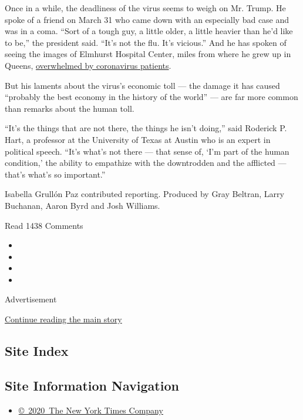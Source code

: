 Once in a while, the deadliness of the virus seems to weigh on Mr.
Trump. He spoke of a friend on March 31 who came down with an especially
bad case and was in a coma. ``Sort of a tough guy, a little older, a
little heavier than he'd like to be,'' the president said. ``It's not
the flu. It's vicious.'' And he has spoken of seeing the images of
Elmhurst Hospital Center, miles from where he grew up in Queens,
\href{https://www.nytimes.com/2020/03/25/nyregion/nyc-coronavirus-hospitals.html}{overwhelmed
by coronavirus patients}.

But his laments about the virus's economic toll --- the damage it has
caused ``probably the best economy in the history of the world'' --- are
far more common than remarks about the human toll.

``It's the things that are not there, the things he isn't doing,'' said
Roderick P. Hart, a professor at the University of Texas at Austin who
is an expert in political speech. ``It's what's not there --- that sense
of, `I'm part of the human condition,' the ability to empathize with the
downtrodden and the afflicted --- that's what's so important.''

Isabella Grullón Paz contributed reporting. Produced by Gray Beltran,
Larry Buchanan, Aaron Byrd and Josh Williams.

Read 1438 Comments

\begin{itemize}
\item
\item
\item
\item
\end{itemize}

Advertisement

\protect\hyperlink{after-bottom}{Continue reading the main story}

\hypertarget{site-index}{%
\subsection{Site Index}\label{site-index}}

\hypertarget{site-information-navigation}{%
\subsection{Site Information
Navigation}\label{site-information-navigation}}

\begin{itemize}
\tightlist
\item
  \href{https://help.nytimes.com/hc/en-us/articles/115014792127-Copyright-notice}{©~2020~The
  New York Times Company}
\end{itemize}

